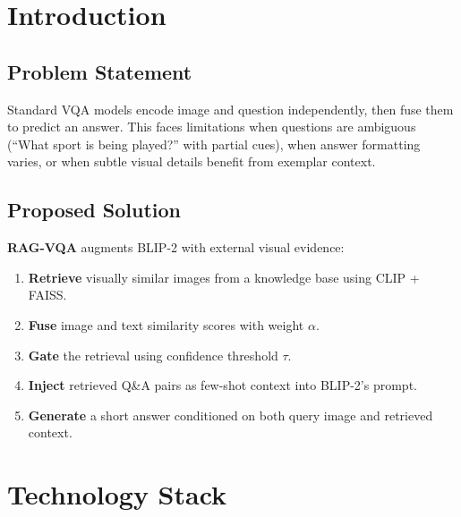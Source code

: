 \documentclass[12pt, a4paper]{article}
\begin{document}
\section{Introduction}

\subsection{Problem Statement}

Standard VQA models encode image and question independently, then fuse them to predict an answer. This faces limitations when questions are ambiguous (``What sport is being played?'' with partial cues), when answer formatting varies, or when subtle visual details benefit from exemplar context.

\subsection{Proposed Solution}

\textbf{RAG-VQA} augments BLIP-2 with external visual evidence:
\begin{enumerate}[leftmargin=1.5cm]
    \item \textbf{Retrieve} visually similar images from a knowledge base using CLIP + FAISS.
    \item \textbf{Fuse} image and text similarity scores with weight $\alpha$.
    \item \textbf{Gate} the retrieval using confidence threshold $\tau$.
    \item \textbf{Inject} retrieved Q\&A pairs as few-shot context into BLIP-2's prompt.
    \item \textbf{Generate} a short answer conditioned on both query image and retrieved context.
\end{enumerate}

\section{Technology Stack}
\end{document}
